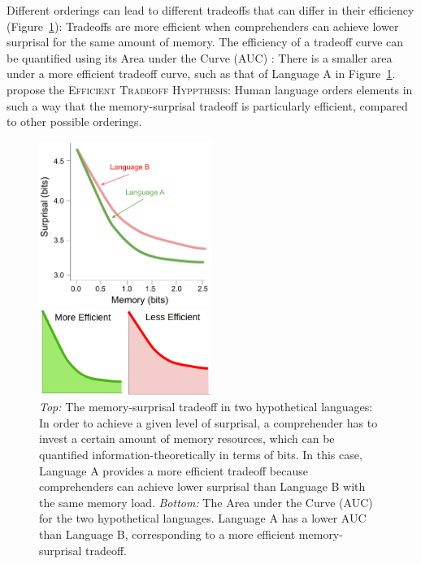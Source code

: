 \documentclass[man]{apa7}
\newcommand{\citep}{\parencite}
\newcommand{\citet}{\Textcite}
\newcommand\mhahn[1]{{\color{red}(#1)}}
\begin{document}
Different orderings can lead to different tradeoffs that can differ in their efficiency (Figure~\ref{fig:tradeoff}): Tradeoffs are more efficient when comprehenders can achieve lower surprisal for the same amount of memory.
The efficiency of a tradeoff curve can be quantified using its Area under the Curve (AUC) \citep{Hahn2020modeling}: There is a smaller area under a more efficient tradeoff curve, such as that of Language A in Figure~\ref{fig:tradeoff}.
\citet{Hahn2020modeling} propose the \textsc{Efficient Tradeoff Hyppthesis}: Human language orders elements in such a way that the memory-surprisal tradeoff is particularly efficient, compared to other possible orderings.

\begin{figure}
    \centering
    \includegraphics[width=0.5\textwidth]{figures/tradeoff.pdf} %
    
    \includegraphics[width=0.5\textwidth]{figures/auc-viz.png}
    \caption{\textit{Top:} The memory-surprisal tradeoff in two hypothetical languages: In order to achieve a given level of surprisal, a comprehender has to invest a certain amount of memory resources, which can be quantified information-theoretically in terms of bits. In this case, Language A provides a more efficient tradeoff because comprehenders can achieve lower surprisal than Language B with the same  memory load.
    \textit{Bottom:} The Area under the Curve (AUC) for the two hypothetical languages. Language A has a lower AUC than Language B, corresponding to a more efficient memory-surprisal tradeoff.}
    \label{fig:tradeoff}
\end{figure}
\end{document}
